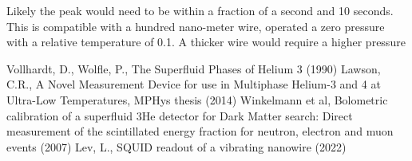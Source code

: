 \documentclass[a4paper,12pt]{article}
\begin{document}
Likely the peak would need to be within a fraction of a second and 10 seconds.
This is compatible with a hundred nano-meter wire, operated a zero pressure with a relative temperature of 0.1. A thicker wire would require a higher pressure




\pagebreak
\newpage

\begin{thebibliography}{9}

 Vollhardt, D., Wolfle, P., The Superfluid Phases of Helium 3 (1990)
 Lawson, C.R., A Novel Measurement Device for use in Multiphase Helium-3 and 4 at Ultra-Low Temperatures, MPHys thesis (2014)
 Winkelmann et al, Bolometric calibration of a superfluid 3He detector for Dark Matter search: Direct measurement of the scintillated energy fraction for
neutron, electron and muon events (2007)
 Lev, L., SQUID readout of a vibrating nanowire (2022)
\end{thebibliography}
\end{document}
